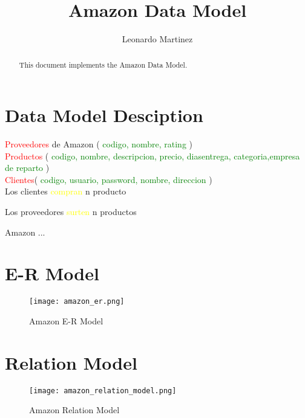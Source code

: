 \documentclass[10pt]{article}         %
\title{Amazon Data Model}
\author{Leonardo Martinez}
\begin{document}
\maketitle

\begin{abstract}
This document implements the Amazon Data Model.
\end{abstract}

\section{Data Model Desciption}


\textcolor{red}{Proveedores} de Amazon ( \textcolor{green}{codigo, nombre, rating} )\\

\textcolor{red}{Productos} ( \textcolor{green}{codigo, nombre, descripcion, precio, diasentrega, categoria,empresa de reparto} )
\\
\textcolor{red}{Clientes}( \textcolor{green}{ codigo, usuario, password, nombre, direccion} )\\

Los clientes \textcolor{yellow}{compran} n producto

Los proveedores \textcolor{yellow}{surten} n productos


Amazon ...
\section{E-R Model}
\begin{figure}[b]
     \texttt{[image: amazon\_er.png]}
     \caption{Amazon E-R Model}
\end{figure}

\section{Relation Model}
\begin{figure}[b]
     \texttt{[image: amazon\_relation\_model.png]}
     \caption{Amazon Relation Model}
\end{figure}
\end{document}
